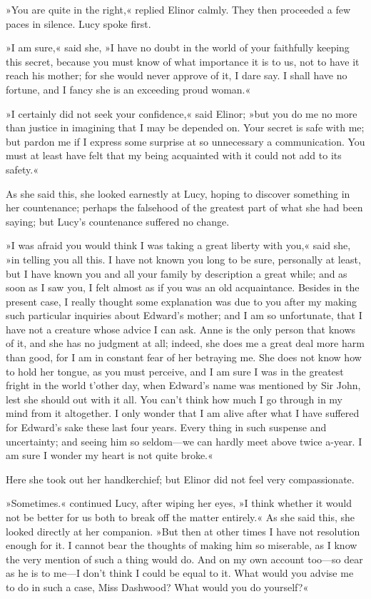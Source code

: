 »You are quite in the right,« replied Elinor calmly. They then proceeded a few paces in silence. Lucy spoke first.

»I am sure,« said she, »I have no doubt in the world of your faithfully keeping this secret, because you must know of what importance it is to us, not to have it reach his mother; for she would never approve of it, I dare say. I shall have no fortune, and I fancy she is an exceeding proud woman.«

»I certainly did not seek your confidence,« said Elinor; »but you do me no more than justice in imagining that I may be depended on. Your secret is safe with me; but pardon me if I express some surprise at so unnecessary a communication. You must at least have felt that my being acquainted with it could not add to its safety.«

As she said this, she looked earnestly at Lucy, hoping to discover something in her countenance; perhaps the falsehood of the greatest part of what she had been saying; but Lucy’s countenance suffered no change.

»I was afraid you would think I was taking a great liberty with you,« said she, »in telling you all this. I have not known you long to be sure, personally at least, but I have known you and all your family by description a great while; and as soon as I saw you, I felt almost as if you was an old acquaintance. Besides in the present case, I really thought some explanation was due to you after my making such particular inquiries about Edward’s mother; and I am so unfortunate, that I have not a creature whose advice I can ask. Anne is the only person that knows of it, and she has no judgment at all; indeed, she does me a great deal more harm than good, for I am in constant fear of her betraying me. She does not know how to hold her tongue, as you must perceive, and I am sure I was in the greatest fright in the world t’other day, when Edward’s name was mentioned by Sir John, lest she should out with it all. You can’t think how much I go through in my mind from it altogether. I only wonder that I am alive after what I have suffered for Edward’s sake these last four years. Every thing in such suspense and uncertainty; and seeing him so seldom—we can hardly meet above twice a-year. I am sure I wonder my heart is not quite broke.«

Here she took out her handkerchief; but Elinor did not feel very compassionate.

»Sometimes.« continued Lucy, after wiping her eyes, »I think whether it would not be better for us both to break off the matter entirely.« As she said this, she looked directly at her companion. »But then at other times I have not resolution enough for it. I cannot bear the thoughts of making him so miserable, as I know the very mention of such a thing would do. And on my own account too—so dear as he is to me—I don’t think I could be equal to it. What would you advise me to do in such a case, Miss Dashwood? What would you do yourself?«

